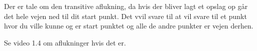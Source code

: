 \documentclass{article}
\begin{document}
\begin{Maple Normal}{
}\end{Maple Normal}
\begin{Maple Normal}{
Der er tale om den transitive aflukning, da hvis der bliver lagt et opslag op går det hele vejen ned til dit start punkt. Det vvil svare til at 
 vil svare til et punkt hvor du ville kunne  og 
 er start punktet og alle de andre punkter er vejen derhen.}\end{Maple Normal}

\begin{Maple Normal}{
}\end{Maple Normal}
\begin{Maple Normal}{
Se video 1.4 om aflukninger hvis det er.}\end{Maple Normal}

\begin{Maple Normal}{
}\end{Maple Normal}
\begin{Maple Normal}{
}\end{Maple Normal}
\end{document}
